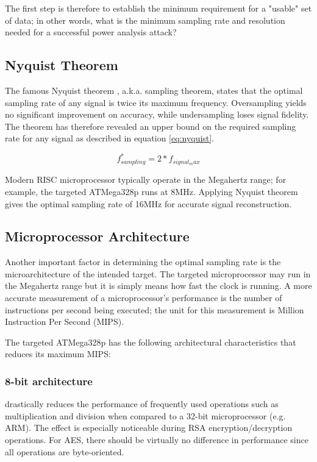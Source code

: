 \documentclass[conference]{IEEEtran}
\begin{document}
The first step is therefore to establish the minimum requirement for a "usable" set of data; in other words, what is the minimum sampling rate and resolution needed for a successful power analysis attack?

\subsection{Nyquist Theorem}
The famous Nyquist theorem \cite{nyquist1928certain}, a.k.a. sampling theorem, states that the optimal sampling rate of any signal is twice its maximum frequency. Oversampling yields no significant improvement on accuracy, while undersampling loses signal fidelity. The theorem has therefore revealed an upper bound on the required sampling rate for any signal as described in equation \ref{eq:nyquist}.

\begin{equation}\label{eq:nyquist}
f^{*}_{sampling} = 2*f_{signal_max}
\end{equation}

Modern RISC microprocessor typically operate in the Megahertz range; for example, the targeted ATMega328p runs at 8MHz. Applying Nyquist theorem gives the optimal sampling rate of 16MHz for accurate signal reconstruction.

\subsection{Microprocessor Architecture}
Another important factor in determining the optimal sampling rate is the microarchitecture of the intended target. The targeted microprocessor may run in the Megahertz range but it is simply means how fast the clock is running. A more accurate measurement of a microprocessor's performance is the number of instructions per second being executed; the unit for this measurement is Million Instruction Per Second (MIPS).

The targeted ATMega328p has the following architectural characteristics that reduces its maximum MIPS:

\subsubsection{8-bit architecture} drastically reduces the performance of frequently used operations such as multiplication and division when compared to a 32-bit microprocessor (e.g. ARM). The effect is especially noticeable during RSA encryption/decryption operations. For AES, there should be virtually no difference in performance since all operations are byte-oriented.
\end{document}

